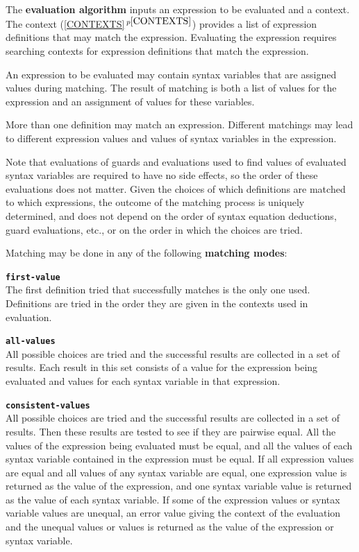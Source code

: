 \documentclass[12pt]{article}
\newcommand{\key}[1]{{\rm \bfseries #1}}
\newcommand{\ttkey}[1]{{\tt \bfseries #1}}
\newcommand{\itemref}[1]{\ref{#1}$\,^{p\pageref{#1}}$}
\begin{document}
The \key{evaluation algorithm} inputs an expression to be evaluated
and a context.  The context (\itemref{CONTEXTS}) provides a list of expression
definitions that may match the expression.  Evaluating the expression
requires searching contexts for expression definitions that match the
expression.

An expression to be evaluated may contain syntax variables that are assigned
values during matching.  The result of matching is both a list of values for
the expression and an assignment of values for these variables.

More than one definition may match an expression.  Different matchings
may lead to different expression values and values of syntax variables
in the expression.

Note that evaluations of guards and evaluations
used to find values of evaluated syntax variables are required to have
no side effects, so the order of these evaluations does not matter.
Given the choices of which definitions are matched to which expressions,
the outcome of the matching process is uniquely determined, and does not
depend on the order of syntax equation deductions, guard evaluations, etc.,
or on the order in which the choices are tried.

Matching may be done in any of the following \key{matching modes}:

\begin{list}{}{}

\item[\ttkey{first-value}]~\\
The first definition tried that successfully matches is the only one
used.  Definitions are tried in the order they are given in the contexts
used in evaluation.

\item[\ttkey{all-values}]~\\
All possible choices are tried and the
successful results are collected in a set of results.  Each result
in this set consists of a value for the expression being evaluated
and values for each syntax variable in that expression.

\item[\ttkey{consistent-values}]~\\
All possible choices are tried and the
successful results are collected in a set of results.  Then these results
are tested to see if they are pairwise equal.
All the values of the expression
being evaluated must be equal, and all the values of each syntax variable
contained in the expression must be equal.  If all expression values are
equal and all values of any syntax variable are equal,
one expression value
is returned as the value of the expression, and one syntax variable value
is returned as the value of each syntax variable.
If some of the expression values or syntax variable values are unequal, an
error value giving the context of the evaluation and the unequal values
or values is returned as the value of the expression or syntax variable.

\end{list}
\end{document}
